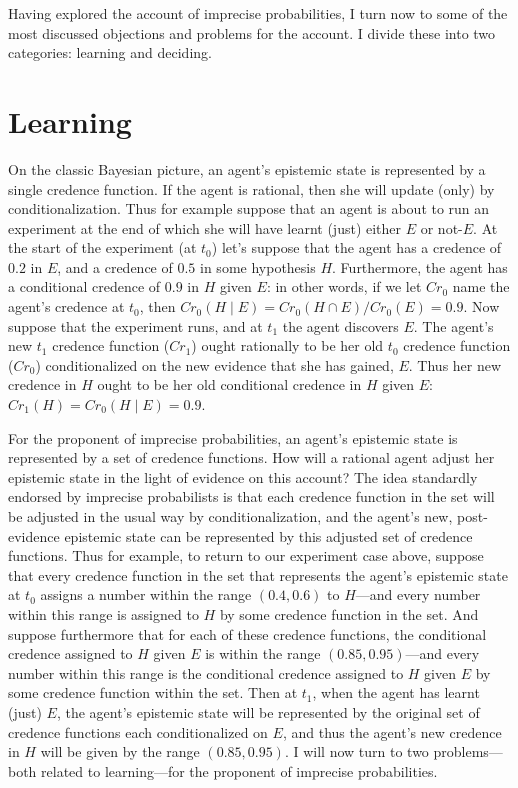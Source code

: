 Having explored the account of imprecise probabilities, I turn now to some of the most discussed objections and problems for the account. I divide these into two categories: learning and deciding. 


\section{Learning}

On the classic Bayesian picture, an agent's epistemic state is represented by a single credence function. If the agent is rational, then she will update (only) by conditionalization. Thus for example suppose that an agent is about to run an experiment at the end of which she will have learnt (just) either $E$ or not-$E$. At the start of the experiment (at $t_0$) let's suppose that the agent has a credence of $0.2$ in $E$, and a credence of $0.5$ in some hypothesis $H$. Furthermore, the agent has a conditional credence of $0.9$ in $H$ given $E$: in other words, if we let $Cr_0$ name the agent's credence at  $t_0$, then $Cr_0(H \mid E) = Cr_0(H \cap E)/Cr_0(E) = 0.9$. Now suppose that the experiment runs, and at $t_1$ the agent discovers $E$. The agent's new $t_1$ credence function ($Cr_1$) ought rationally to be her old $t_0$ credence function ($Cr_0$) conditionalized on the new evidence that she has gained, $E$. Thus her new credence in $H$ ought to be her old conditional credence in $H$ given $E$: $Cr_1(H) = Cr_0(H \mid E) = 0.9$. 

For the proponent of imprecise probabilities, an agent's epistemic state is represented by a set of credence functions. How will a rational agent adjust her epistemic state in the light of evidence on this account? The idea standardly endorsed by imprecise probabilists is that each credence function in the set will be adjusted in the usual way by conditionalization, and the agent's new, post-evidence epistemic state can be represented by this adjusted set of credence functions. Thus for example, to return to our experiment case above, suppose that every credence function in the set that represents the agent's epistemic state at $t_0$ assigns a number within the range $(0.4, 0.6)$ to $H$---and every number within this range is assigned to $H$ by some credence function in the set. And suppose furthermore that for each of these credence functions, the conditional credence assigned to $H$ given $E$ is within the range $(0.85, 0.95)$---and every number within this range is the conditional credence assigned to $H$ given $E$ by some credence function within the set. Then at $t_1$, when the agent has learnt (just) $E$, the agent's epistemic state will be represented by the original set of credence functions each conditionalized on $E$, and thus the agent's new credence in $H$ will be given by the range $(0.85, 0.95)$. I will now turn to two problems---both related to learning---for the proponent of imprecise probabilities.  


